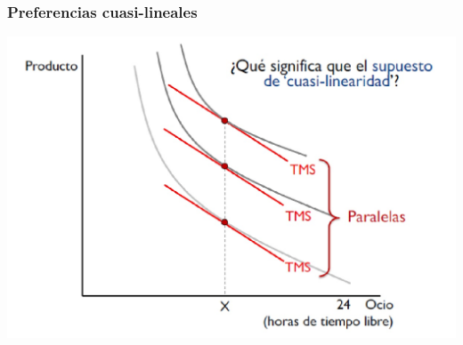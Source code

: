 \documentclass{beamer}
\begin{document}
\begin{frame}
\frametitle{Preferencias cuasi-lineales}
\centering
\includegraphics[scale=0.3]{../Figures/Tema_04.5_prefcuasilin.jpg}
\end{frame}
\end{document}
